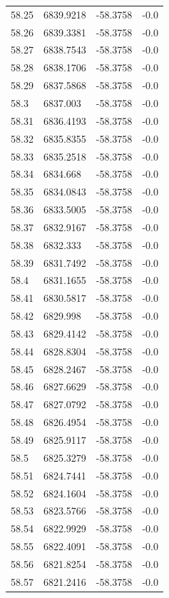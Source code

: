 \begin{table}[H]
\begin{tabular}{llll}
58.25 & 6839.9218 & -58.3758 & -0.0 \\
58.26 & 6839.3381 & -58.3758 & -0.0 \\
58.27 & 6838.7543 & -58.3758 & -0.0 \\
58.28 & 6838.1706 & -58.3758 & -0.0 \\
58.29 & 6837.5868 & -58.3758 & -0.0 \\
58.3 & 6837.003 & -58.3758 & -0.0 \\
58.31 & 6836.4193 & -58.3758 & -0.0 \\
58.32 & 6835.8355 & -58.3758 & -0.0 \\
58.33 & 6835.2518 & -58.3758 & -0.0 \\
58.34 & 6834.668 & -58.3758 & -0.0 \\
58.35 & 6834.0843 & -58.3758 & -0.0 \\
58.36 & 6833.5005 & -58.3758 & -0.0 \\
58.37 & 6832.9167 & -58.3758 & -0.0 \\
58.38 & 6832.333 & -58.3758 & -0.0 \\
58.39 & 6831.7492 & -58.3758 & -0.0 \\
58.4 & 6831.1655 & -58.3758 & -0.0 \\
58.41 & 6830.5817 & -58.3758 & -0.0 \\
58.42 & 6829.998 & -58.3758 & -0.0 \\
58.43 & 6829.4142 & -58.3758 & -0.0 \\
58.44 & 6828.8304 & -58.3758 & -0.0 \\
58.45 & 6828.2467 & -58.3758 & -0.0 \\
58.46 & 6827.6629 & -58.3758 & -0.0 \\
58.47 & 6827.0792 & -58.3758 & -0.0 \\
58.48 & 6826.4954 & -58.3758 & -0.0 \\
58.49 & 6825.9117 & -58.3758 & -0.0 \\
58.5 & 6825.3279 & -58.3758 & -0.0 \\
58.51 & 6824.7441 & -58.3758 & -0.0 \\
58.52 & 6824.1604 & -58.3758 & -0.0 \\
58.53 & 6823.5766 & -58.3758 & -0.0 \\
58.54 & 6822.9929 & -58.3758 & -0.0 \\
58.55 & 6822.4091 & -58.3758 & -0.0 \\
58.56 & 6821.8254 & -58.3758 & -0.0 \\
58.57 & 6821.2416 & -58.3758 & -0.0 \\

\end{tabular}
\end{table}
